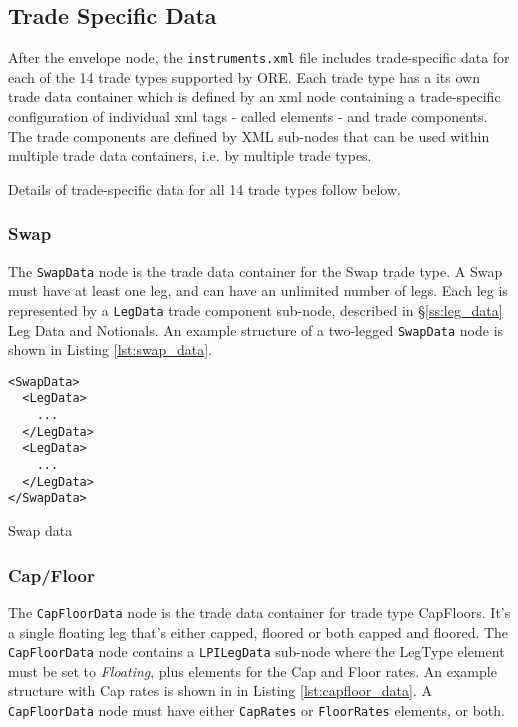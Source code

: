 \subsection{Trade Specific Data}

After the envelope node, the {\tt instruments.xml} file includes trade-specific data for each of the 14 trade types supported by ORE. Each trade type has a its own trade data container which is defined by an xml node containing a trade-specific configuration of individual xml tags - called elements - and trade components. The  trade components are defined by XML sub-nodes that can be used within multiple trade data containers, i.e.  by multiple trade types.

\vspace{1em}

Details of  trade-specific data for all 14 trade types follow below.

\subsubsection{Swap}

The \lstinline!SwapData! node is the trade data container for the Swap trade type. A Swap must have at least one leg, and can have an unlimited number of legs. Each leg is represented by a \lstinline!LegData! trade component sub-node, described in \S \ref{ss:leg_data} Leg Data and Notionals. An example structure of a two-legged \lstinline!SwapData! node  is shown in Listing \ref{lst:swap_data}.

\begin{listing}[H]
\begin{verbatim}
<SwapData>
  <LegData>
    ...
  </LegData>
  <LegData>
    ...
  </LegData>
</SwapData>
\end{verbatim}
\caption{Swap data}
\label{lst:swap_data}
\end{listing}

\subsubsection{Cap/Floor}

The \lstinline!CapFloorData! node is the trade data container for trade type CapFloors.  It's a single floating leg that's either capped, floored or both capped and floored. The \lstinline!CapFloorData! node contains a \lstinline!LPILegData!  sub-node where the LegType element must be set to  \emph{Floating}, plus elements for the Cap and Floor rates. An example structure with Cap rates is shown in  in Listing \ref{lst:capfloor_data}. A \lstinline!CapFloorData! node must have either \lstinline!CapRates! or \lstinline!FloorRates! elements, or both. 

